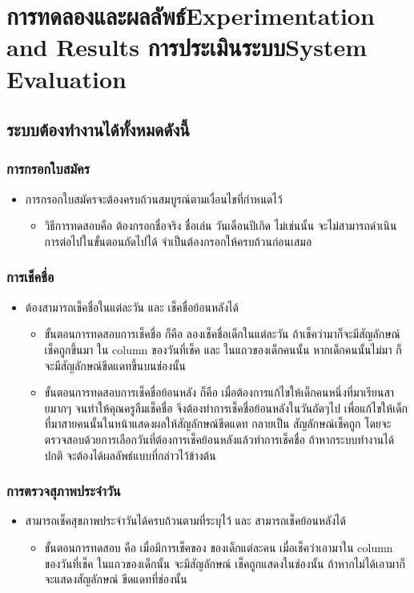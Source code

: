 \chapter{\ifproject%
\ifcpe การทดลองและผลลัพธ์\else Experimentation and Results\fi
\else%
\ifcpe การประเมินระบบ\else System Evaluation\fi
\fi}


\section{ระบบต้องทำงานได้ทั้งหมดดังนี้}
\subsection{การกรอกใบสมัคร}
\begin{itemize}
    \item การกรอกใบสมัครจะต้องครบถ้วนสมบูรณ์ตามเงื่อนไขที่กำหนดไว้
    \begin{itemize}
        \item วิธีการทดสอบคือ ต้องกรอกชื่อจริง ชื่อเล่น วันเดือนปีเกิด ไม่เช่นนั้น จะไม่สามารถดำเนินการต่อไปในขั้นตอนถัดไปได้ จำเป็นต้องกรอกให้ครบถ้วนก่อนเสมอ
    \end{itemize}
\end{itemize}
\subsection{การเช็คชื่อ}
\begin{itemize}
    \item ต้องสามารถเช็คชื่อในแต่ละวัน และ เช็คชื่อย้อนหลังได้
    \begin{itemize}
        \item ขั้นตอนการทดสอบการเช็คชื่อ  ก็คือ  ลองเช็คชื่อเด็กในแต่ละวัน  ถ้าเช็คว่ามาก็จะมีสัญลักษณ์เช็คถูกขึ้นมา ใน column ของวันที่เช็ค และ ในแถวของเด็กคนนั้น  หากเด็กคนนั้นไม่มา ก็จะมีสัญลักษณ์ขีดแดทขึ้นบนช่องนั้น
        \item ขั้นตอนการทดสอบการเช็คชื่อย้อนหลัง  ก็คือ  เมื่อต้องการแก้ไขให้เด็กคนหนึ่งที่มาเรียนสายมากๆ  จนทำให้คุณครูลืมเช็คชื่อ  จึงต้องทำการเช็คชื่อย้อนหลังในวันถัดๆไป  เพื่อแก้ไขให้เด็กที่มาสายคนนั้นในหน้าแสดงผลให้สัญลักษณ์ขีดแดท กลายเป็น สัญลักษณ์เช็คถูก  โดยจะตรวจสอบด้วยการเลือกวันที่ต้องการเช็คย้อนหลังแล้วทำการเช็คชื่อ  ถ้าหากระบบทำงานได้ปกติ  จะต้องได้ผลลัพธ์แบบที่กล่าวไว้ข้างต้น
    \end{itemize}
\end{itemize}
\subsection{การตรวจสุภาพประจำวัน}
\begin{itemize}
    \item สามารถเช็คสุขภาพประจำวันได้ครบถ้วนตามที่ระบุไว้ และ สามารถเช็คย้อนหลังได้
    \begin{itemize}
        \item ขั้นตอนการทดสอบ คือ เมื่อมีการเช็คของ ของเด็กแต่ละคน  เมื่อเช็คว่าเอามาใน column ของวันที่เช็ค ในแถวของเด็กนั้น จะมีสัญลักษณ์ เช็คถูกแสดงในช่องนั้น  ถ้าหากไม่ได้เอามาก็จะแสดงสัญลักษณ์ ขีดแดทที่ช่องนั้น
    \end{itemize}
\end{itemize}
